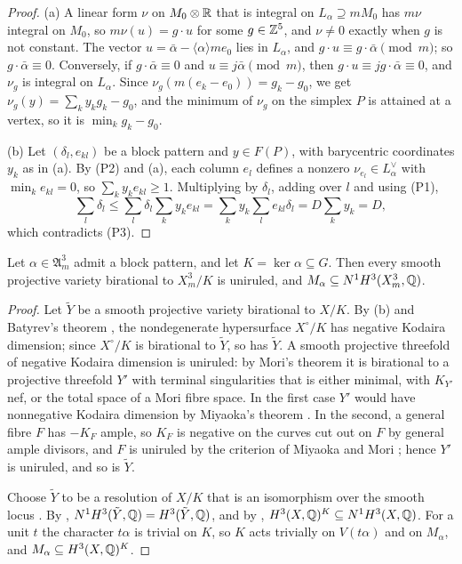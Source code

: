 \begin{proof}
(a) A linear form $\nu$ on $M_{0}\otimes\mathbb{R}$ that is integral on $L_{\alpha}
\supseteq mM_{0}$ has $m\nu$ integral on $M_{0}$, so $m\nu(u)=g\cdot u$ for
some $g\in\mathbb{Z}^{5}$, and $\nu\ne0$ exactly when $g$ is not constant. The
vector $u=\bar\alpha-\langle\alpha\rangle me_{0}$ lies in $L_{\alpha}$, and
$g\cdot u\equiv g\cdot\bar\alpha\pmod m$; so $g\cdot\bar\alpha\equiv0$.
Conversely, if $g\cdot\bar\alpha\equiv0$ and $u\equiv j\bar\alpha\pmod m$,
then $g\cdot u\equiv jg\cdot\bar\alpha\equiv0$, and $\nu_{g}$ is integral on
$L_{\alpha}$. Since $\nu_{g}(m(e_{k}-e_{0}))=g_{k}-g_{0}$, we get
$\nu_{g}(y)=\sum_{k}y_{k}g_{k}-g_{0}$, and the minimum of $\nu_{g}$ on the
simplex $P$ is attained at a vertex, so it is $\min_{k}g_{k}-g_{0}$.

(b) Let $(\delta_{l},e_{kl})$ be a block pattern and $y\in F(P)$, with
barycentric coordinates $y_{k}$ as in (a). By (P2) and (a), each column
$e_{l}$ defines a nonzero $\nu_{e_{l}}\in L_{\alpha}^{\vee}$ with
$\min_{k}e_{kl}=0$, so $\sum_{k}y_{k}e_{kl}\ge1$. Multiplying by $\delta_{l}$,
adding over $l$ and using (P1),
\[
  \sum_{l}\delta_{l}\le\sum_{l}\delta_{l}\sum_{k}y_{k}e_{kl}=\sum_{k}y_{k}
  \sum_{l}e_{kl}\delta_{l}=D\sum_{k}y_{k}=D,
\]
which contradicts (P3).
\end{proof}

\begin{theorem}\label{thm:uniruled}
Let $\alpha\in\mathfrak A^{3}_{m}$ admit a block pattern, and let
$K=\ker\alpha\subseteq G$. Then every smooth projective variety birational to
$X^{3}_{m}/K$ is uniruled, and $M_{\alpha}\subseteq N^{1}H^{3}(X^{3}_{m},
\mathbb{Q})$.
\end{theorem}

\begin{proof}
Let $\tilde Y$ be a smooth projective variety birational to $X/K$. By
(b) and Batyrev's theorem \cite[Corollary~5.6]{Bat24}, the
nondegenerate hypersurface $X^{\circ}/K$ has negative Kodaira dimension;
since $X^{\circ}/K$ is birational to $\tilde Y$, so has $\tilde Y$. A smooth
projective threefold of negative Kodaira dimension is uniruled: by Mori's
theorem \cite{Mor88} it is birational to a projective threefold $Y'$ with
terminal singularities that is either minimal, with $K_{Y'}$ nef, or the
total space of a Mori fibre space. In the first case $Y'$ would have
nonnegative Kodaira dimension by Miyaoka's theorem \cite{Miy88}. In the
second, a general fibre $F$ has $-K_{F}$ ample, so $K_{F}$ is negative on
the curves cut out on $F$ by general ample divisors, and $F$ is uniruled by
the criterion of Miyaoka and Mori \cite{MM86}; hence $Y'$ is uniruled, and so
is $\tilde Y$.

Choose $\tilde Y$ to be a resolution of $X/K$ that is an isomorphism over
the smooth locus \cite{Hir64}. By ,
$N^{1}H^{3}(\tilde Y,\mathbb{Q})=H^{3}(\tilde Y,\mathbb{Q})$, and by
, $H^{3}(X,\mathbb{Q})^{K}\subseteq N^{1}H^{3}(X,\mathbb{Q})$. For a
unit $t$ the character $t\alpha$ is trivial on $K$, so $K$ acts trivially on
$V(t\alpha)$ and on $M_{\alpha}$, and $M_{\alpha}\subseteq H^{3}(X,\mathbb{Q})^{K}$.
\end{proof}

